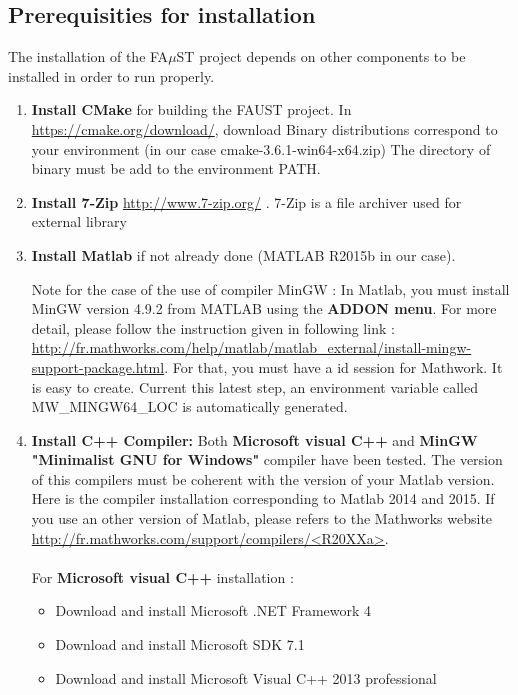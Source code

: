\subsection{Prerequisities for installation}\label{sec:WinPrerequisitiesInstall}
The installation of the FA$\mu$ST project depends on other components to be installed in order to run properly. 
\begin{enumerate}

\item \textbf{Install CMake} for building the FAUST project. 
In \url{https://cmake.org/download/}, download Binary distributions correspond to your environment (in our case  cmake-3.6.1-win64-x64.zip)
The directory of binary must be add to the environment PATH. 

\item \textbf{Install 7-Zip} \url{http://www.7-zip.org/} . 7-Zip is a file archiver used for external library

\item \textbf{Install Matlab} if not already done (MATLAB R2015b in our case).

Note for the case of the use of compiler MinGW : In Matlab, you must install MinGW version 4.9.2 from MATLAB using the \textbf{ADDON menu}. For more detail, please follow the instruction given in following link :  
\url{http://fr.mathworks.com/help/matlab/matlab_external/install-mingw-support-package.html}. For that, you must have a id session for Mathwork. It is easy to create. 
Current this latest step, an environment variable called MW\_MINGW64\_LOC is automatically generated. 


\item \textbf{Install C++ Compiler:} Both \textbf{Microsoft visual C++} and \textbf{MinGW "Minimalist GNU for Windows"} compiler have been tested. The version of this compilers must be coherent with the version of your Matlab version. Here is the compiler installation corresponding to Matlab 2014 and 2015. If you use an other version of Matlab, please refers to the Mathworks website \url{http://fr.mathworks.com/support/compilers/<R20XXa>}.

\paragraph{}For \textbf{Microsoft visual C++} installation :
\begin{itemize}
\item Download and install Microsoft .NET Framework 4
\item Download and install Microsoft SDK 7.1
\item Download and install Microsoft Visual C++ 2013 professional
\end{itemize}


\end{enumerate}
